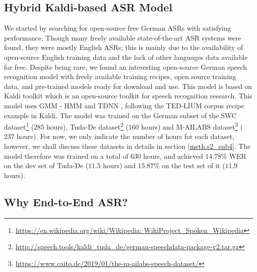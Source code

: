 \subsection{Hybrid Kaldi-based ASR Model}
\label{meth:s2_sub1}

We started by searching for open-source free German \ac{ASR}s with satisfying performance. Though many freely available state-of-the-art \ac{ASR} systems were found, they were mostly English \ac{ASR}s; this is mainly due to the availability of open-source English training data and the lack of other languages data available for free. Despite being rare, we found an interesting open-source German speech recognition model \cite{milde2018open} with freely available training recipes, open source training data, and pre-trained models ready for download and use. This model is based on Kaldi toolkit \cite{daniel2011kaldi} which is an open-source toolkit for speech recognition research. This model \cite{milde2018open} uses \ac{GMM} - \acf{HMM} and \ac{TDNN} \cite{waibel1990readings} \cite{peddinti2015time}, following the TED-LIUM corpus recipe example \cite{rousseau2014enhancing} in Kaldi. The model \cite{milde2018open} was trained on the German subset of the \ac{SWC} dataset\footnote{\url{https://en.wikipedia.org/wiki/Wikipedia: WikiProject_Spoken_Wikipedia}} ($285$ hours), Tuda-De dataset\footnote{\url{http://speech.tools/kaldi_tuda_de/german-speechdata-package-v2.tar.gz}} \cite{radeck2015open} ($160$ hours) and M-AILABS dataset\footnote{\url{https://www.caito.de/2019/01/the-m-ailabs-speech-dataset/}} ($237$ hours). For now, we only indicate the number of hours for each dataset, however, we shall discuss these datasets in details in section \ref{meth:s2_sub4}. The model therefore was trained on a total of $630$ hours, and achieved $14.78\%$ \ac{WER} on the dev set of Tuda-De ($11.5$ hours) and $15.87\%$ on the test set of it ($11.9$ hours).

\subsection{Why End-to-End ASR?}
\label{meth:s2_sub2}

